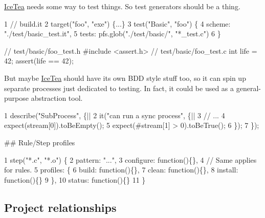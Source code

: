 \hyperlink{class_ice_tea}{Ice\+Tea} needs some way to test things. So test generators should be a thing.


\begin{DoxyCode}
1 // build.it
2 target("foo", "exe") \{...\}
3 test("Basic", "foo") \{
4     scheme: "./test/basic\_test.it",
5     tests: pfs.glob("./test/basic/", "*\_test.c")
6 \}
\end{DoxyCode}
 
 
\begin{DoxyCode}
\textcolor{comment}{// test/basic/foo\_test.h}
\textcolor{preprocessor}{#include <assert.h>}
\textcolor{comment}{// test/basic/foo\_test.c}
\textcolor{keywordtype}{int} life = 42;
assert(life == 42);
\end{DoxyCode}


But maybe \hyperlink{class_ice_tea}{Ice\+Tea} should have it\textquotesingle{}s own B\+DD style stuff too, so it can spin up separate processes just dedicated to testing. In fact, it could be used as a general-\/purpose abstraction tool. 
\begin{DoxyCode}
1 describe("SubProcess", \{||
2     it("can run a sync process", \{||
3         // ...
4         expect(stream[0]).toBeEmpty();
5         expect(#stream[1] > 0).toBeTrue();
6     \});
7 \});
\end{DoxyCode}


\#\# Rule/\+Step profiles 
\begin{DoxyCode}
1 step("*.c", "*.o") \{
2     pattern: "...",
3     configure: function()\{\},
4     // Same applies for rules.
5     profiles: \{
6         build: function()\{\},
7         clean: function()\{\},
8         install: function()\{\}
9     \},
10     status: function()\{\}
11 \}
\end{DoxyCode}


\subsection*{Project relationships}


